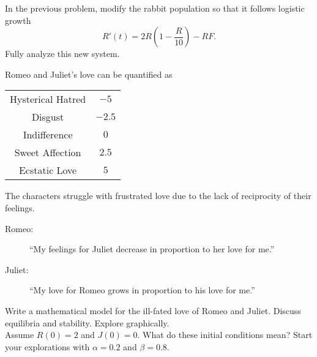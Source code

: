 \begin{problem}
    In the previous problem, modify the rabbit population so that it follows logistic
    growth
    \[ R'(t) = 2R\left( 1-\frac{R}{10} \right) - RF. \]
    Fully analyze this new system.
\end{problem}

\begin{problem}
    Romeo and Juliet's love can be quantified as
    \begin{center}
        \begin{tabular}{|c|c|}
            \hline
            Hysterical Hatred & $-5$ \\
            Disgust & $-2.5$ \\
            Indifference & $0$ \\
            Sweet Affection & $2.5$ \\
            Ecstatic Love & $5$ \\ \hline
        \end{tabular}
    \end{center}
    The characters struggle with frustrated love due to the lack of reciprocity of their
    feelings.
    \begin{description}
        \item[Romeo:] ``My feelings for Juliet decrease in proportion to her love for
            me.''
        \item[Juliet:] ``My love for Romeo grows in proportion to his love for me.''
    \end{description}
    Write a mathematical model for the ill-fated love of Romeo and Juliet.  Discuss
    equilibria and stability. Explore graphically. \\Assume $R(0) = 2$ and $J(0)=0$.  What do these initial
    conditions mean? Start your explorations with $\alpha = 0.2$ and $\beta = 0.8$.
\end{problem}



